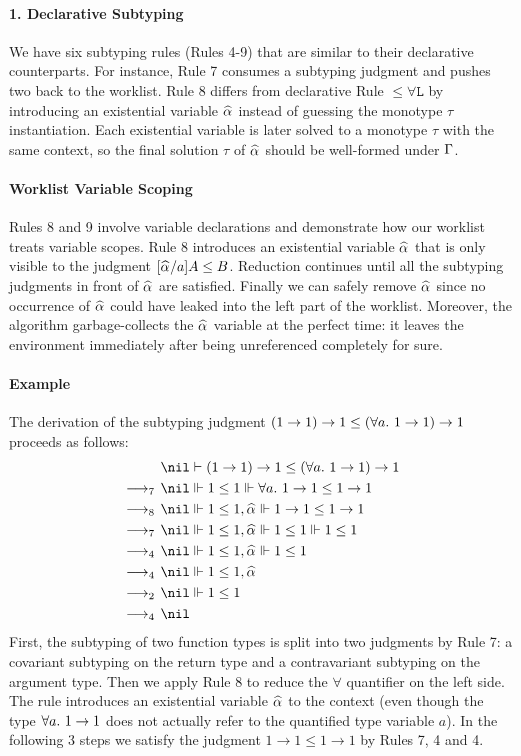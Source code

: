 \paragraph{{\bf 1. Declarative Subtyping}}
We have six subtyping rules (Rules 4-9) that are similar to their
declarative counterparts. For instance, Rule 7 consumes a subtyping
judgment and pushes two back to the worklist.  Rule 8 differs from
declarative Rule $\mathtt{{\le}{\forall}L}$ by introducing an existential
variable $\al$ instead of guessing the monotype $\tau$
instantiation. Each existential variable is later solved to a
monotype $\tau$ with the same context, so the final solution $\tau$ of
$\al$ should be well-formed under $\Gamma$.

\paragraph{Worklist Variable Scoping}
Rules 8 and 9 involve variable declarations and demonstrate how our
worklist treats variable scopes. Rule 8 introduces an existential
variable $\al$ that is only visible to the judgment $[\al/a]A \le B$.
Reduction continues until all the subtyping judgments in front of $\al$
are satisfied.  Finally we can safely remove $\al$ since no occurrence
of $\al$ could have leaked into the left part of the worklist.  Moreover,
the algorithm garbage-collects the $\al$
variable at the perfect time: it leaves the environment immediately
after being unreferenced completely for sure.

\paragraph{Example} The derivation of the subtyping judgment
$(1\to 1)\to 1 \le (\all 1\to 1) \to 1$ proceeds as follows:
\begin{gather*}
\begin{aligned}
  & \nil\vdash (1\to 1)\to 1 \le (\all 1 \to 1) \to 1\\
\rrule{7}  & \nil \Vdash 1 \le 1 \Vdash \all 1 \to 1 \le 1 \to 1\\
\rrule{8}  & \nil \Vdash 1 \le 1 ,\al \Vdash 1 \to 1 \le 1 \to 1\\
\rrule{7}  & \nil \Vdash 1 \le 1 ,\al \Vdash 1 \le 1 \Vdash 1 \le 1\\
\rrule{4} & \nil \Vdash 1 \le 1 ,\al \Vdash 1 \le 1\\
\rrule{4} & \nil \Vdash 1 \le 1 ,\al\\
\rrule{2} & \nil \Vdash 1 \le 1\\
\rrule{4} & \nil
\end{aligned}
\end{gather*}
First, the subtyping of two function types is split into two judgments by Rule 7:
a covariant subtyping on the return type and a contravariant subtyping on the argument type.
Then we apply Rule 8 to reduce the $\forall$ quantifier on the left side.
The rule introduces an existential variable $\al$ to the context (even though 
the type $\all 1 \to 1$ does not actually refer to the quantified type
variable $a$).
In the following 3 steps we satisfy the judgment $1 \to 1 \le 1 \to 1$ by Rules 7, 4 and 4.


